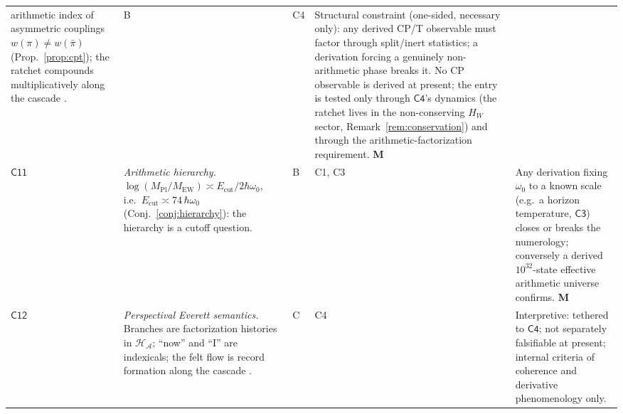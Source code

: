 \documentclass[11pt,a4paper]{article}
\theoremstyle{plain}
\theoremstyle{definition}
\theoremstyle{remark}
\newcommand{\Hil}{\mathcal{H}}
\begin{document}
\begin{longtable}{@{}p{}p{}p{}p{}p{}@{}}
arithmetic index of asymmetric couplings $w(\pi)\neq w(\bar\pi)$
(Prop.~\ref{prop:cpt}); the ratchet compounds multiplicatively along the cascade
\cite{vaccaro2016}. &
B &
C4 &
Structural constraint (one-sided, necessary only): any derived CP/T observable must factor
through split/inert statistics; a derivation forcing a genuinely non-arithmetic phase breaks
it. No CP observable is derived at present; the entry is tested only through $\mathsf{C4}$'s
dynamics (the ratchet lives in the non-conserving $H_{W}$ sector,
Remark~\ref{rem:conservation}) and through the arithmetic-factorization requirement. \textbf{M}\\
$\mathsf{C11}$ &
\emph{Arithmetic hierarchy.} $\log(M_{\mathrm{Pl}}/M_{\mathrm{EW}})\asymp
E_{\mathrm{cut}}/2\hbar\omega_{0}$, i.e.\ $E_{\mathrm{cut}}\asymp74\,\hbar\omega_{0}$
(Conj.~\ref{conj:hierarchy}): the hierarchy is a cutoff question. &
B &
C1, C3 &
Any derivation fixing $\omega_{0}$ to a known scale (e.g.\ a horizon temperature,
$\mathsf{C3}$) closes or breaks the numerology; conversely a derived
$10^{32}$-state effective arithmetic universe confirms. \textbf{M}\\
$\mathsf{C12}$ &
\emph{Perspectival Everett semantics.} Branches are factorization histories in
$\Hil_{\mathcal{A}}$; ``now'' and ``I'' are indexicals; the felt flow is record formation
along the cascade \cite{wallace2012,kaplan1989}. &
C &
C4 &
Interpretive: tethered to $\mathsf{C4}$; not separately falsifiable at present;
internal criteria of coherence and derivative phenomenology only.\\
\end{longtable}
\end{document}
